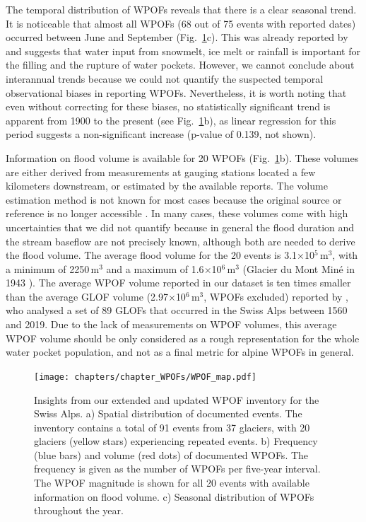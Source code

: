 The temporal distribution of WPOFs reveals that there is a clear seasonal trend. It is noticeable that almost all WPOFs (68 out of 75 events with reported dates) occurred between June and September (Fig.~\ref{fig:WPOFs_map}c). This was already reported by \cite{Haeberli1983} and suggests that water input from snowmelt, ice melt or rainfall is important for the filling and the rupture of water pockets. However, we cannot conclude about interannual trends because we could not quantify the suspected temporal observational biases in reporting WPOFs. Nevertheless, it is worth noting that even without correcting for these biases, no statistically significant trend is apparent from 1900 to the present (see Fig.~\ref{fig:WPOFs_map}b), as linear regression for this period suggests a non-significant increase (p-value of 0.139, not shown).

Information on flood volume is available for 20 WPOFs (Fig.~\ref{fig:WPOFs_map}b). These volumes are either derived from measurements at gauging stations located a few kilometers downstream, or estimated by the available reports. The volume estimation method is not known for most cases because the original source or reference is no longer accessible \citep[e.g.][]{Haeberli1983}. In many cases, these volumes come with high uncertainties that we did not quantify because in general the flood duration and the stream baseflow are not precisely known, although both are needed to derive the flood volume. The average flood volume for the 20 events is 3.1$\times$10$^5$\,m$^3$, with a minimum of 2250\,m$^3$ and a maximum of 1.6$\times$10$^6$\,m$^3$ (Glacier du Mont Miné in 1943 \citep{Bohorquez&Darby2008}). The average WPOF volume reported in our dataset is ten times smaller than the average GLOF volume (2.97$\times$10$^6$\,m$^3$, WPOFs excluded) reported by \cite{Veh&al2022}, who analysed a set of 89 GLOFs that occurred in the Swiss Alps between 1560 and 2019. Due to the lack of measurements on WPOF volumes, this average WPOF volume should be only considered as a rough representation for the whole water pocket population, and not as a final metric for alpine WPOFs in general.

\begin{figure}
    \centering
    \texttt{[image: chapters/chapter\_WPOFs/WPOF\_map.pdf]}
    \caption{Insights from our extended and updated WPOF inventory for the Swiss Alps. a) Spatial distribution of documented events. The inventory contains a total of 91 events from 37 glaciers, with 20 glaciers (yellow stars) experiencing repeated events. b) Frequency (blue bars) and volume (red dots) of documented WPOFs. The frequency is given as the number of WPOFs per five-year interval. The WPOF magnitude is shown for all 20 events with available information on flood volume. c) Seasonal distribution of WPOFs throughout the year.}
    \label{fig:WPOFs_map}
\end{figure}


